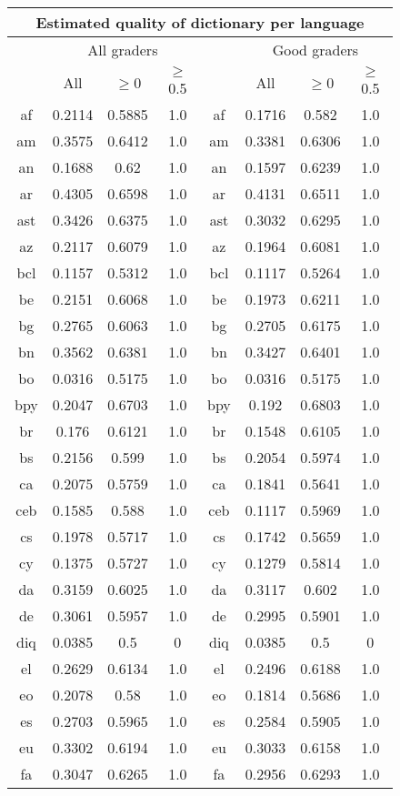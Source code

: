 \begin{figure}[h]
\centering
\begin{tabular}{cccc|cccc}
\multicolumn{8}{c}{Estimated quality of dictionary per language}\\
\hline\hline
&\multicolumn{3}{c}{All graders}& &\multicolumn{3}{c}{Good graders}\\
&All&$\geq$0&$\geq$0.5& &All&$\geq$0&$\geq$0.5\\\hline
af&0.2114&0.5885&1.0&	af&0.1716&0.582&1.0\\
am&0.3575&0.6412&1.0&	am&0.3381&0.6306&1.0\\
an&0.1688&0.62&1.0&	an&0.1597&0.6239&1.0\\
ar&0.4305&0.6598&1.0&	ar&0.4131&0.6511&1.0\\
ast&0.3426&0.6375&1.0&	ast&0.3032&0.6295&1.0\\
az&0.2117&0.6079&1.0&	az&0.1964&0.6081&1.0\\
bcl&0.1157&0.5312&1.0&	bcl&0.1117&0.5264&1.0\\
be&0.2151&0.6068&1.0&	be&0.1973&0.6211&1.0\\
bg&0.2765&0.6063&1.0&	bg&0.2705&0.6175&1.0\\
bn&0.3562&0.6381&1.0&	bn&0.3427&0.6401&1.0\\
bo&0.0316&0.5175&1.0&	bo&0.0316&0.5175&1.0\\
bpy&0.2047&0.6703&1.0&	bpy&0.192&0.6803&1.0\\
br&0.176&0.6121&1.0&	br&0.1548&0.6105&1.0\\
bs&0.2156&0.599&1.0&	bs&0.2054&0.5974&1.0\\
ca&0.2075&0.5759&1.0&	ca&0.1841&0.5641&1.0\\
ceb&0.1585&0.588&1.0&	ceb&0.1117&0.5969&1.0\\
cs&0.1978&0.5717&1.0&	cs&0.1742&0.5659&1.0\\
cy&0.1375&0.5727&1.0&	cy&0.1279&0.5814&1.0\\
da&0.3159&0.6025&1.0&	da&0.3117&0.602&1.0\\
de&0.3061&0.5957&1.0&	de&0.2995&0.5901&1.0\\
diq&0.0385&0.5&0&	diq&0.0385&0.5&0\\
el&0.2629&0.6134&1.0&	el&0.2496&0.6188&1.0\\
eo&0.2078&0.58&1.0&	eo&0.1814&0.5686&1.0\\
es&0.2703&0.5965&1.0&	es&0.2584&0.5905&1.0\\
eu&0.3302&0.6194&1.0&	eu&0.3033&0.6158&1.0\\
fa&0.3047&0.6265&1.0&	fa&0.2956&0.6293&1.0\\

\end{tabular}
\end{figure}
